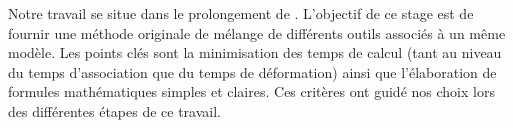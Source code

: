 Notre travail se situe dans le prolongement de \cite{GPCP13}. L'objectif de ce
stage est de fournir une méthode originale de mélange de différents outils
associés à un même modèle. Les points clés sont la minimisation des temps de
calcul (tant au niveau du temps d'association que du temps de déformation)
ainsi que l'élaboration de formules mathématiques simples et claires. Ces
critères ont guidé nos choix lors des différentes étapes de ce travail.
